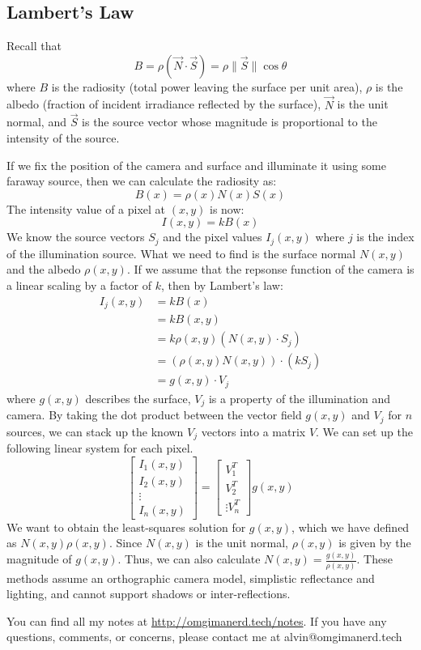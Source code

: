 \documentclass{math}
\begin{document}
\subsection*{Lambert's Law}
Recall that
\[ B = \rho(\vec{N}\cdot\vec{S}) = \rho\|\vec{S}\|\cos\theta \]
where \( B \) is the radiosity (total power leaving the surface per unit area),
\( \rho \) is the albedo (fraction of incident irradiance reflected by the
surface), \( \vec{N} \) is the unit normal, and \( \vec{S} \) is the source
vector whose magnitude is proportional to the intensity of the source. \par
If we fix the position of the camera and surface and illuminate it using some
faraway source, then we can calculate the radiosity as:
\[ B(x) = \rho(x)N(x)S(x) \]
The intensity value of a pixel at \( (x,y) \) is now:
\[ I(x,y) = kB(x) \]
We know the source vectors \( S_j \) and the pixel values \( I_j(x,y) \) where
\( j \) is the index of the illumination source. What we need to find is the
surface normal \( N(x,y) \) and the albedo \( \rho(x,y) \). If we assume that
the repsonse function of the camera is a linear scaling by a factor of \( k \),
then by Lambert's law:
\begin{align*}
  I_j(x,y) &= kB(x) \\
  &= kB(x,y) \\
  &= k\rho(x,y)(N(x,y)\cdot S_j) \\
  &= (\rho(x,y)N(x,y))\cdot(kS_j) \\
  &= g(x,y)\cdot V_j
\end{align*}
where \( g(x,y) \) describes the surface, \( V_j \) is a property of the
illumination and camera. By taking the dot product between the vector field
\( g(x,y) \) and \( V_j \) for \( n \) sources, we can stack up the known
\( V_j \) vectors into a matrix \( V \). We can set up the following linear
system for each pixel.
\[ \begin{bmatrix}
  I_1(x,y) \\
  I_2(x,y) \\
  \vdots \\
  I_n(x,y)
\end{bmatrix} = \begin{bmatrix}
  V_1^T \\
  V_2^T \\
  \vdots
  V_n^T
\end{bmatrix}g(x,y) \]
We want to obtain the least-squares solution for \( g(x,y) \), which we have
defined as \( N(x,y)\rho(x,y) \). Since \( N(x,y) \) is the unit normal,
\( \rho(x,y) \) is given by the magnitude of \( g(x,y) \). Thus, we can
also calculate \( N(x,y) = \frac{g(x,y)}{\rho(x,y)} \). These methods assume
an orthographic camera model, simplistic reflectance and lighting, and
cannot support shadows or inter-reflections.

\begin{center}
  You can find all my notes at \url{http://omgimanerd.tech/notes}. If you have
  any questions, comments, or concerns, please contact me at
  alvin@omgimanerd.tech
\end{center}
\end{document}
